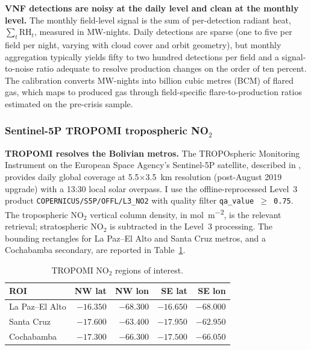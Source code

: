 \documentclass[11pt,letterpaper]{article}
\newcommand{\claim}[1]{\textbf{#1.}}
\begin{document}
\claim{VNF detections are noisy at the daily level and clean at the monthly level} The monthly field-level signal is the sum of per-detection radiant heat, $\textstyle \sum_t \text{RH}_t$, measured in MW-nights. Daily detections are sparse (one to five per field per night, varying with cloud cover and orbit geometry), but monthly aggregation typically yields fifty to two hundred detections per field and a signal-to-noise ratio adequate to resolve production changes on the order of ten percent. The \citet{elvidge_energies2016} calibration converts MW-nights into billion cubic metres (BCM) of flared gas, which maps to produced gas through field-specific flare-to-production ratios estimated on the pre-crisis sample.

\subsubsection{Sentinel-5P TROPOMI tropospheric NO$_2$}

\claim{TROPOMI resolves the Bolivian metros} The TROPOspheric Monitoring Instrument on the European Space Agency's Sentinel-5P satellite, described in \citet{veefkind2012}, provides daily global coverage at \num{5.5}$\times$\num{3.5}~km resolution (post-August \num{2019} upgrade) with a \num{13}:\num{30} local solar overpass. I use the offline-reprocessed Level~3 product \texttt{COPERNICUS/S5P/OFFL/L3\_NO2} with quality filter \texttt{qa\_value $\geq$ 0.75}. The tropospheric NO$_2$ vertical column density, in \unit{mol\per m\squared}, is the relevant retrieval; stratospheric NO$_2$ is subtracted in the Level~3 processing. The bounding rectangles for La Paz--El Alto and Santa Cruz metros, and a Cochabamba secondary, are reported in Table~\ref{tab:no2_rois}.

\begin{table}[H]
\centering
\caption{TROPOMI NO$_2$ regions of interest.}
\label{tab:no2_rois}
\small
\begin{tabular}{lrrrr}
\toprule
ROI & NW lat & NW lon & SE lat & SE lon \\
\midrule
La Paz--El Alto & $-16.350$ & $-68.300$ & $-16.650$ & $-68.000$ \\
Santa Cruz & $-17.600$ & $-63.400$ & $-17.950$ & $-62.950$ \\
Cochabamba & $-17.300$ & $-66.300$ & $-17.500$ & $-66.050$ \\
\bottomrule
\end{tabular}
\end{table}
\end{document}
